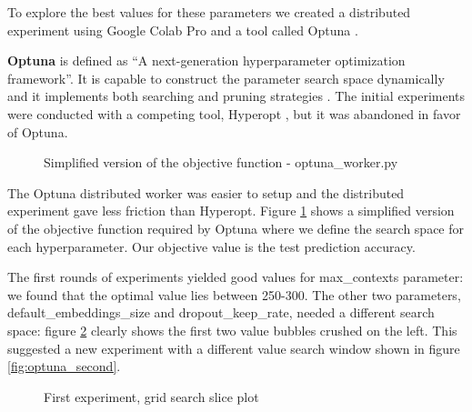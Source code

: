 To explore the best values for these parameters we created a distributed experiment using Google Colab Pro and a tool called Optuna . 

\textbf{Optuna} is defined as ``A next-generation hyperparameter optimization framework''. It is capable to construct the parameter search space dynamically and it implements both searching and pruning strategies \cite{optuna_2019}. The initial experiments were conducted with a competing tool, Hyperopt \cite{bergstra2013making}, but it was abandoned in favor of Optuna.

\begin{figure}
 \centering
 \caption[]{Simplified version of the objective function - optuna\_worker.py}
    \label{fig:optuna_objective}
\end{figure}

The Optuna distributed worker was easier to setup and the distributed experiment gave less friction than Hyperopt. Figure \ref{fig:optuna_objective} shows a simplified version of the objective function required by Optuna where we define the search space for each hyperparameter. Our objective value is the test prediction accuracy.

The first rounds of experiments yielded good values for max\_contexts parameter: we found that the optimal value lies between 250-300. The other two parameters, default\_embeddings\_size and dropout\_keep\_rate, needed a different search space: figure \ref{fig:optuna_first} clearly shows the first two value bubbles crushed on the left. This suggested a new experiment with a different value search window shown in figure \ref{fig:optuna_second}. 

\begin{figure}
 \centering
 \caption[]{First experiment, grid search slice plot}
    \label{fig:optuna_first}
\end{figure}


